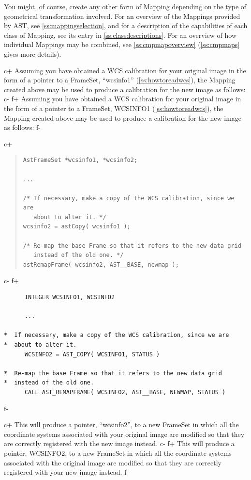 \documentclass[twoside,11pt]{article}
\newcommand{\appref}[1]{Appendix~\ref{#1}}
\newcommand{\secref}[1]{\S\ref{#1}}
\renewcommand{\appref}[1]{\ref{#1}}
\renewcommand{\secref}[1]{\ref{#1}}
\begin{document}
You might, of course, create any other form of Mapping depending on
the type of geometrical transformation involved. For an overview of
the Mappings provided by AST, see \secref{ss:mappingselection}, and
for a description of the capabilities of each class of Mapping, see
its entry in \appref{ss:classdescriptions}. For an overview of how
individual Mappings may be combined, see \secref{ss:cmpmapoverview}
(\secref{ss:cmpmaps} gives more details).

c+
Assuming you have obtained a WCS calibration for your original image
in the form of a pointer to a FrameSet, ``wcsinfo1''
(\secref{ss:howtoreadwcs}), the Mapping created above may be used to
produce a calibration for the new image as follows:
c-
f+
Assuming you have obtained a WCS calibration for your original image
in the form of a pointer to a FrameSet, WCSINFO1
(\secref{ss:howtoreadwcs}), the Mapping created above may be used to
produce a calibration for the new image as follows:
f-

c+
\begin{quote}
\small
\begin{verbatim}
AstFrameSet *wcsinfo1, *wcsinfo2;

...

/* If necessary, make a copy of the WCS calibration, since we are
   about to alter it. */
wcsinfo2 = astCopy( wcsinfo1 );

/* Re-map the base Frame so that it refers to the new data grid
   instead of the old one. */
astRemapFrame( wcsinfo2, AST__BASE, newmap );
\end{verbatim}
\normalsize
\end{quote}
c-
f+
\small
\begin{verbatim}
      INTEGER WCSINFO1, WCSINFO2

      ...

*  If necessary, make a copy of the WCS calibration, since we are
*  about to alter it.
      WCSINFO2 = AST_COPY( WCSINFO1, STATUS )

*  Re-map the base Frame so that it refers to the new data grid
*  instead of the old one.
      CALL AST_REMAPFRAME( WCSINFO2, AST__BASE, NEWMAP, STATUS )
\end{verbatim}
\normalsize
f-

c+
This will produce a pointer, ``wcsinfo2'', to a new FrameSet in which
all the coordinate systems associated with your original image are
modified so that they are correctly registered with the new image
instead.
c-
f+
This will produce a pointer, WCSINFO2, to a new FrameSet in which all
the coordinate systems associated with the original image are modified
so that they are correctly registered with your new image instead.
f-
\end{document}
